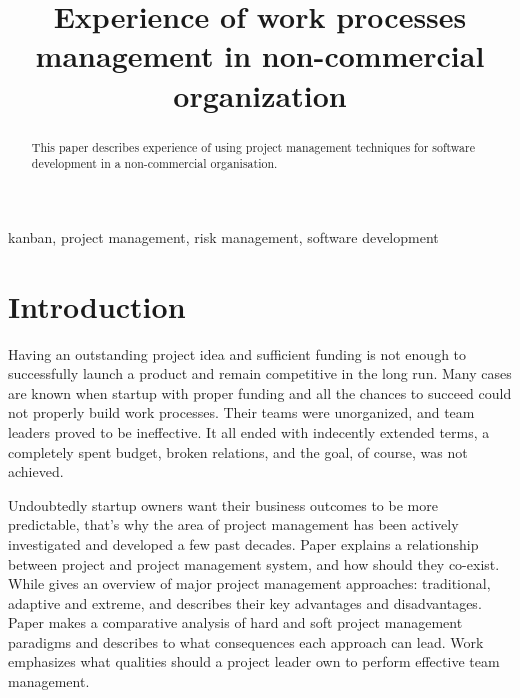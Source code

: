\documentclass[conference]{IEEEtran}
\begin{document}
    \title{Experience of work processes management in non-commercial organization \\
    }

    \author{
    }

    \maketitle

    \begin{abstract}
        This paper describes experience of using project management techniques for software development in a non-commercial organisation.
    \end{abstract}

    \begin{IEEEkeywords}
        kanban, project management, risk management, software development
    \end{IEEEkeywords}

    \section{Introduction}\label{sec:introduction}
    Having an outstanding project idea and sufficient funding is not enough to successfully launch a product and remain competitive in the long run.
    Many cases are known when startup with proper funding and all the chances to succeed could not properly build work processes.
    Their teams were unorganized, and team leaders proved to be ineffective.
    It all ended with indecently extended terms, a completely spent budget, broken relations, and the goal, of course, was not achieved.

    Undoubtedly startup owners want their business outcomes to be more predictable, that's why the area of project management has been actively investigated and developed a few past decades.
    Paper \cite{b1} explains a relationship between project and project management system, and how should they co-exist.
    While \cite{b2} gives an overview of major project management approaches: traditional, adaptive and extreme, and describes their key advantages and disadvantages.
    Paper \cite{b3} makes a comparative analysis of hard and soft project management paradigms and describes to what consequences each approach can lead.
    Work \cite{b4} emphasizes what qualities should a project leader own to perform effective team management.
\end{document}

